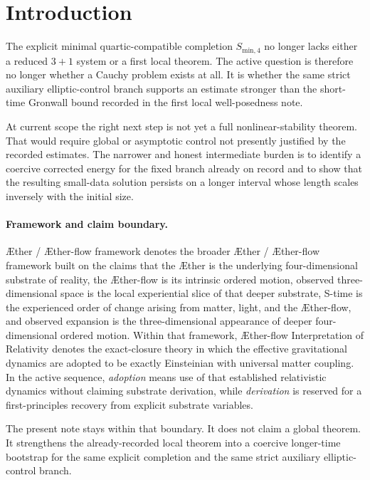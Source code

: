 \documentclass[11pt]{article}
\newcommand{\Aether}{\AE{}ther}
\newcommand{\Aflow}{\AE{}ther-flow}
\newcommand{\TheoryName}{\Aflow{} Interpretation of Relativity}
\newcommand{\TheoryProgram}{\Aether{} / \Aflow{} framework}
\begin{document}
\section{Introduction}

The explicit minimal quartic-compatible completion \(S_{\mathrm{min},4}\) no longer lacks either a reduced \(3+1\) system or a first local theorem. The active question is therefore no longer whether a Cauchy problem exists at all. It is whether the same strict auxiliary elliptic-control branch supports an estimate stronger than the short-time Gronwall bound recorded in the first local well-posedness note.

At current scope the right next step is not yet a full nonlinear-stability theorem. That would require global or asymptotic control not presently justified by the recorded estimates. The narrower and honest intermediate burden is to identify a coercive corrected energy for the fixed branch already on record and to show that the resulting small-data solution persists on a longer interval whose length scales inversely with the initial size.

\paragraph{Framework and claim boundary.}
\TheoryProgram{} denotes the broader \Aether{} / \Aflow{} framework built on the claims that the \Aether{} is the underlying four-dimensional substrate of reality, the \Aflow{} is its intrinsic ordered motion, observed three-dimensional space is the local experiential slice of that deeper substrate, S-time is the experienced order of change arising from matter, light, and the \Aflow{}, and observed expansion is the three-dimensional appearance of deeper four-dimensional ordered motion. Within that framework, \TheoryName{} denotes the exact-closure theory in which the effective gravitational dynamics are adopted to be exactly Einsteinian with universal matter coupling. In the active sequence, \emph{adoption} means use of that established relativistic dynamics without claiming substrate derivation, while \emph{derivation} is reserved for a first-principles recovery from explicit substrate variables.

The present note stays within that boundary. It does not claim a global theorem. It strengthens the already-recorded local theorem into a coercive longer-time bootstrap for the same explicit completion and the same strict auxiliary elliptic-control branch.
\end{document}
